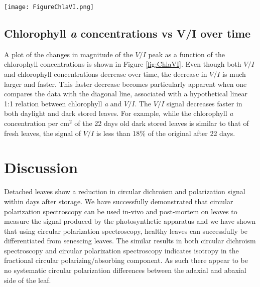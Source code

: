 \documentclass[review]{elsarticle}
\begin{document}
\begin{figure*}[]
  \centering
  \texttt{[image: FigureChlaVI.png]}
  \caption{Average of the $V/I$ peak at 685-692 nm versus the Chlorophyll \textit{a} concentration over time for the daylight and dark stored leaves; the dashed line portrays a linear relationship. The dotted lines show the linear fit through the actual data for the daylight ($r^{2}=0.94$) and dark ($r^{2}=0.67$) stored leaves. The larger decrease in $V/I$ is primarily caused by the breakdown of the supramolecular structure; the chlorophyll \textit{a} levels show a much smaller decrease.  Vertical error bars denote the SE (n=6), horizontal error bars denote the SD (n=3).}
  \label{fig:ChlaVI}
\end{figure*}

\subsection{Chlorophyll \textit{a} concentrations vs V/I over time}
A plot of the changes in magnitude of the $V/I$ peak as a function of the chlorophyll concentrations is shown in Figure \ref{fig:ChlaVI}. Even though both $V/I$ and chlorophyll concentrations decrease over time, the decrease in $V/I$ is much larger and faster. This faster decrease becomes particularly apparent when one compares the data with the diagonal line, associated with  a hypothetical linear 1:1 relation between chlorophyll \textit{a} and $V/I$. The $V/I$ signal decreases faster in both daylight and dark stored leaves. For example, while the chlorophyll \textit{a} concentration per cm$^{2}$ of the 22 days old dark stored leaves is similar to that of fresh leaves, the signal of $V/I$ is less than 18\% of the original after 22 days. 



\section{Discussion}

Detached leaves show a reduction in circular dichroism and polarization signal within days after storage. We have successfully demonstrated that circular polarization spectroscopy can be used in-vivo and post-mortem on leaves to measure the signal produced by the photosynthetic apparatus and we have shown that using circular polarization spectroscopy, healthy leaves can successfully be differentiated from senescing leaves. The similar results in both circular dichroism spectroscopy and circular polarization spectroscopy indicates isotropy in the fractional circular polarizing/absorbing component. As such there appear to be no systematic circular polarization differences between the adaxial and abaxial side of the leaf. 
\end{document}
